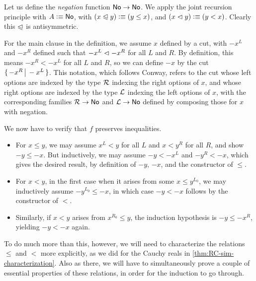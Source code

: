 \begin{eg}
  Let us define the \emph{negation} function $\mathsf{No}\to\mathsf{No}$.
  We apply the joint recursion principle with $A\vcentcolon\equiv\mathsf{No}$, with $(x\trianglelefteqslant y)\vcentcolon\equiv (y\le x)$, and $(x\vartriangleleft y)\vcentcolon\equiv (y< x)$.
  Clearly this $\trianglelefteqslant$ is antisymmetric.

  For the main clause in the definition, we assume $x$ defined by a cut, with $-x^L$ and $-x^R$ defined such that $-x^L \vartriangleleft -x^R$ for all $L$ and $R$.
  By definition, this means $-x^R< -x^L$ for all $L$ and $R$, so we can define $-x$ by the cut $\{\,-x^R\,\big|\,-x^L\,\}$.
  This notation, which follows Conway, refers to the cut whose left options are indexed by the type $\mathcal{R}$ indexing the right options of $x$, and whose right options are indexed by the type $\mathcal{L}$ indexing the left options of $x$, with the corresponding families $\mathcal{R}\to\mathsf{No}$ and $\mathcal{L}\to\mathsf{No}$ defined by composing those for $x$ with negation.

  We now have to verify that $f$ preserves inequalities.
  \begin{itemize}
  \item For $x\le y$, we may assume $x^L<y$ for all $L$ and $x < y^R$ for all $R$, and show $-y\le -x$.
    But inductively, we may assume $-y <-x^L$ and $-y^R<-x$, which gives the desired result, by definition of $-y$, $-x$, and the constructor of $\le$.
  \item For $x<y$, in the first case when it arises from some $x\le y^{L_0}$, we may inductively assume $-y^{L_0} \le -x$, in which case $-y<-x$ follows by the constructor of $<$.
  \item Similarly, if $x<y$ arises from $x^{R_0}\le y$, the induction hypothesis is $-y \le -x^R$, yielding $-y<-x$ again.
  \end{itemize}
\end{eg}

To do much more than this, however, we will need to characterize the relations $\le$ and $<$ more explicitly, as we did for the Cauchy reals in \autoref{thm:RC-sim-characterization}.
Also as there, we will have to simultaneously prove a couple of essential properties of these relations, in order for the induction to go through.

